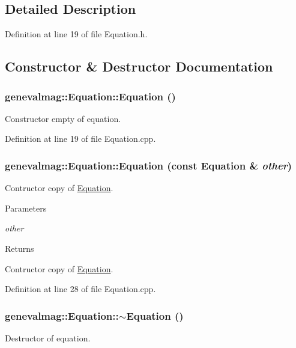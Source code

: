 \subsection{Detailed Description}


Definition at line 19 of file Equation.h.



\subsection{Constructor \& Destructor Documentation}
\hypertarget{classgenevalmag_1_1Equation_a76d5ce9bfc75bcf3cee68e133d1d4faf}{
\subsubsection[{Equation}]{\setlength{\rightskip}{0pt plus 5cm}genevalmag::Equation::Equation ()}}
\label{classgenevalmag_1_1Equation_a76d5ce9bfc75bcf3cee68e133d1d4faf}
Constructor empty of equation. 

Definition at line 19 of file Equation.cpp.

\hypertarget{classgenevalmag_1_1Equation_a82897cc7187c5c6f8cf1552387856f0f}{
\subsubsection[{Equation}]{\setlength{\rightskip}{0pt plus 5cm}genevalmag::Equation::Equation (const {\bf Equation} \& {\em other})}}
\label{classgenevalmag_1_1Equation_a82897cc7187c5c6f8cf1552387856f0f}
Contructor copy of \hyperlink{classgenevalmag_1_1Equation}{Equation}. 
\begin{DoxyParams}{Parameters}
\item[{\em other}]\end{DoxyParams}
\begin{DoxyReturn}{Returns}

\end{DoxyReturn}
Contructor copy of \hyperlink{classgenevalmag_1_1Equation}{Equation}. 

Definition at line 28 of file Equation.cpp.

\hypertarget{classgenevalmag_1_1Equation_a6b4b11ce2cb5bb1f6dfaa2257ef0fe97}{
\subsubsection[{$\sim$Equation}]{\setlength{\rightskip}{0pt plus 5cm}genevalmag::Equation::$\sim$Equation ()}}
\label{classgenevalmag_1_1Equation_a6b4b11ce2cb5bb1f6dfaa2257ef0fe97}
Destructor of equation. 

